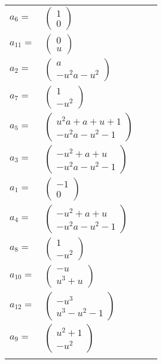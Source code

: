 \documentclass[1p]{elsarticle_modified}
\theoremstyle{definition}
\begin{document}
\begin{tabular}{m{7pt} m{180pt} m{7pt} m{180pt} }
\flushright $a_{6}=$&$\begin{pmatrix}1\\0\end{pmatrix}$ \\
\flushright $a_{11}=$&$\begin{pmatrix}0\\u\end{pmatrix}$ \\
\flushright $a_{2}=$&$\begin{pmatrix}a\\- u^2 a- u^2\end{pmatrix}$ \\
\flushright $a_{7}=$&$\begin{pmatrix}1\\- u^2\end{pmatrix}$ \\
\flushright $a_{5}=$&$\begin{pmatrix}u^2 a+a+u+1\\- u^2 a- u^2-1\end{pmatrix}$ \\
\flushright $a_{3}=$&$\begin{pmatrix}- u^2+a+u\\- u^2 a- u^2-1\end{pmatrix}$ \\
\flushright $a_{1}=$&$\begin{pmatrix}-1\\0\end{pmatrix}$ \\
\flushright $a_{4}=$&$\begin{pmatrix}- u^2+a+u\\- u^2 a- u^2-1\end{pmatrix}$ \\
\flushright $a_{8}=$&$\begin{pmatrix}1\\- u^2\end{pmatrix}$ \\
\flushright $a_{10}=$&$\begin{pmatrix}- u\\u^3+u\end{pmatrix}$ \\
\flushright $a_{12}=$&$\begin{pmatrix}- u^3\\u^3- u^2-1\end{pmatrix}$ \\
\flushright $a_{9}=$&$\begin{pmatrix}u^2+1\\- u^2\end{pmatrix}$\\&\end{tabular}
\end{document}
